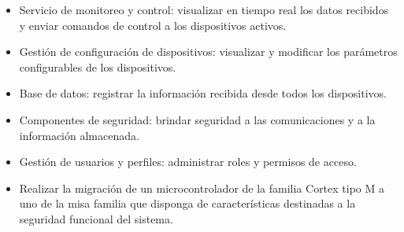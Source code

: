 \begin{itemize}
	\item Servicio de monitoreo y control: visualizar en tiempo real los datos recibidos y enviar comandos de control a los dispositivos activos. 

    \item Gestión de configuración de dispositivos: visualizar y modificar los parámetros configurables de los dispositivos. 

    \item Base de datos: registrar la información recibida desde todos los dispositivos.

    \item Componentes de seguridad: brindar seguridad a las comunicaciones y a la información almacenada. 

    \item Gestión de usuarios y perfiles: administrar roles y permisos de acceso.

    \item Realizar la migración de un microcontrolador de la familia Cortex tipo M a uno de la misa familia que disponga de características destinadas a la seguridad funcional del sistema. 
\end{itemize}

